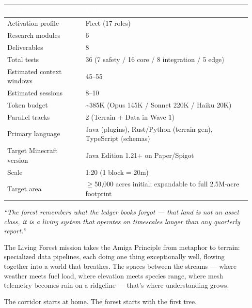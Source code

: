 \documentclass[11pt,letterpaper]{article}
\newcommand{\tableheader}[1]{\textbf{\sffamily\textcolor{white}{#1}}}
\begin{document}
\begin{center}
\begin{tabularx}{\textwidth}{L{5cm}X}
\toprule
{}
\tableheader{Metric} & \tableheader{Value} \\
\midrule
Activation profile & Fleet (17 roles) \\
Research modules & 6 \\
Deliverables & 8 \\
Total tests & 36 (7 safety / 16 core / 8 integration / 5 edge) \\
Estimated context windows & 45--55 \\
Estimated sessions & 8--10 \\
Token budget & \textasciitilde385K (Opus 145K / Sonnet 220K / Haiku 20K) \\
Parallel tracks & 2 (Terrain + Data in Wave 1) \\
Primary language & Java (plugins), Rust/Python (terrain gen), TypeScript (schemas) \\
Target Minecraft version & Java Edition 1.21+ on Paper/Spigot \\
Scale & 1:20 (1 block = 20m) \\
Target area & $\geq$50,000 acres initial; expandable to full 2.5M-acre footprint \\
\bottomrule
\end{tabularx}
\end{center}

\vspace{1em}

\begin{quotebox}
\emph{``The forest remembers what the ledger books forgot --- that land is not an asset class, it is a living system that operates on timescales longer than any quarterly report.''}

\vspace{0.5em}
The Living Forest mission takes the Amiga Principle from metaphor to terrain: specialized data pipelines, each doing one thing exceptionally well, flowing together into a world that breathes. The spaces between the streams --- where weather meets fuel load, where elevation meets species range, where mesh telemetry becomes rain on a ridgeline --- that's where understanding grows.

The corridor starts at home. The forest starts with the first tree.
\end{quotebox}
\end{document}
